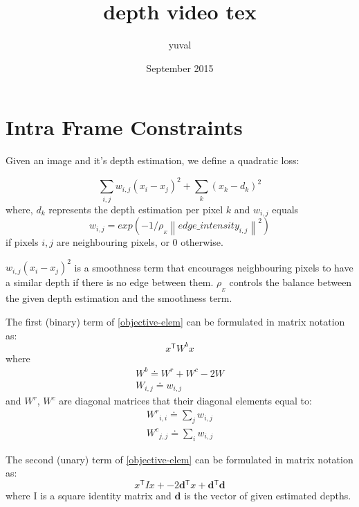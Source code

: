 \documentclass{article}
\title{depth video tex}
\author{yuval }
\date{September 2015}
\newcommand{\norm}[1]{\left\lVert #1 \right\rVert}
\newcommand\mat[1]{{#1}}
\newcommand{\T}{{}^\mathsf{T}}
\newcommand{\eqdef}{\doteq}
\renewcommand\vec[1]{\mathbf{#1}}
\begin{document}
\maketitle

\section{Intra Frame Constraints}

Given an image and it's depth estimation, we define a quadratic loss:

\begin{equation}
\sum_{i,j}{w_{i,j} (x_i  - x_j)^2} + \sum_{k}{(x_k - d_k)^2}
\label{objective-elem}
\end{equation}
where, $d_k$ represents the depth estimation per pixel $k$ and $w_{i,j}$ equals
\begin{equation}
w_{i,j} = exp(-1/\rho_{_{E}} \norm{edge\_intensity_{i,j}}^2)
\label{weights_intra}
\end{equation}
if pixels $i,j$ are neighbouring pixels, or $0$ otherwise. 

${w_{i,j} (x_i  - x_j)^2}$ is a smoothness term that encourages neighbouring pixels to have a similar depth if there is no edge between them.
$\rho_{_{E}}$ controls the balance between the given depth estimation and the smoothness term.

The first (binary) term of \eqref{objective-elem} can be formulated in matrix notation as:
\begin{equation}
x\T \mat{W^{b}} x
\end{equation}
where 
\begin{align}
\mat{W^{b}} \eqdef \mat{W^{r}} + \mat{W^{c}} - 2\mat{W}\\
\mat{W}_{i,j} \eqdef w_{i,j}
\end{align}
and $\mat{W^{r}}$, $\mat{W^{c}}$ are diagonal matrices that their diagonal elements equal to:
\begin{align}
\mat{W^{r}}_{i,i} \eqdef \sum_{j}{w_{i,j}}\\ \mat{W^{c}}_{j,j} \eqdef \sum_{i}{w_{i,j}} \end{align}

The second (unary) term of \eqref{objective-elem} can be formulated in matrix notation as:
\begin{equation}
x\T \mat{I} x + -2 \vec{d}\T x + \vec{d}\T \vec{d}
\end{equation}
where \mat{I} is a square identity matrix and $\vec{d}$ is the vector of given estimated depths.
\end{document}
